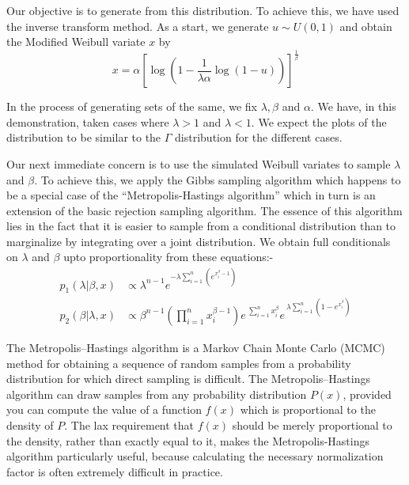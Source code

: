 \documentclass[11pt]{article}
\numberwithin{equation}{section}
\begin{document}
Our objective is to generate from this distribution. To achieve this, we have used the inverse transform method. As a start, we generate $u \sim U\left(0, 1\right)$ and obtain the Modified Weibull variate $x$ by 
\begin{equation}	\label{eq:inv_mod_weibull_cdf}
x = \alpha \left[\log\left(1 - \dfrac{1}{\lambda \alpha} \log\left(1 - u\right)\right)\right]^{\frac{1}{\beta}}
\end{equation}

In the process of generating sets of the same, we fix $\lambda, \beta$ and $\alpha$. We have, in this demonstration, taken cases where $\lambda > 1$ and $\lambda < 1$. We expect the plots of the distribution to be similar to the $\Gamma$ distribution for the different cases. \medskip

Our next immediate concern is to use the simulated Weibull variates to sample $\lambda$ and $\beta$. To achieve this, we apply the Gibbs sampling algorithm which happens to be a special case of the ``Metropolis-Hastings algorithm'' which in turn is an extension of the basic rejection sampling algorithm. The essence of this algorithm lies in the fact that it is easier to sample from a conditional distribution than to marginalize by integrating over a joint distribution. We obtain full conditionals on $\lambda$ and $\beta$ upto proportionality from these equations:-
\begin{subequations}
	\begin{align}
		p_1\left(\lambda | \beta, x\right) &\propto \lambda^{n - 1} e^{-\lambda \sum\limits_{i=1}^n \left(e^{x_i^\beta - 1}\right)} \label{eq:p1} \\[0.3cm]
		p_2\left(\beta | \lambda, x\right) &\propto \beta^{n - 1} \left(\displaystyle\prod\limits_{i=1}^n x_i^{\beta - 1} \right) e^{\: \sum\limits_{i=1}^n x_i^\beta} e^{\: \lambda \sum\limits_{i=1}^n \left(1 - e^{x_i^\beta}\right)} \label{eq:p2}
	\end{align}
\end{subequations}

The Metropolis–Hastings algorithm is a Markov Chain Monte Carlo (MCMC) method for obtaining a sequence of random samples from a probability distribution for which direct sampling is difficult. The Metropolis–Hastings algorithm can draw samples from any probability distribution $P\left(x\right)$, provided you can compute the value of a function $f\left(x\right)$ which is proportional to the density of $P$. The lax requirement that $f\left(x\right)$ should be merely proportional to the density, rather than exactly equal to it, makes the Metropolis-Hastings algorithm particularly useful, because calculating the necessary normalization factor is often extremely difficult in practice. \medskip
\end{document}
